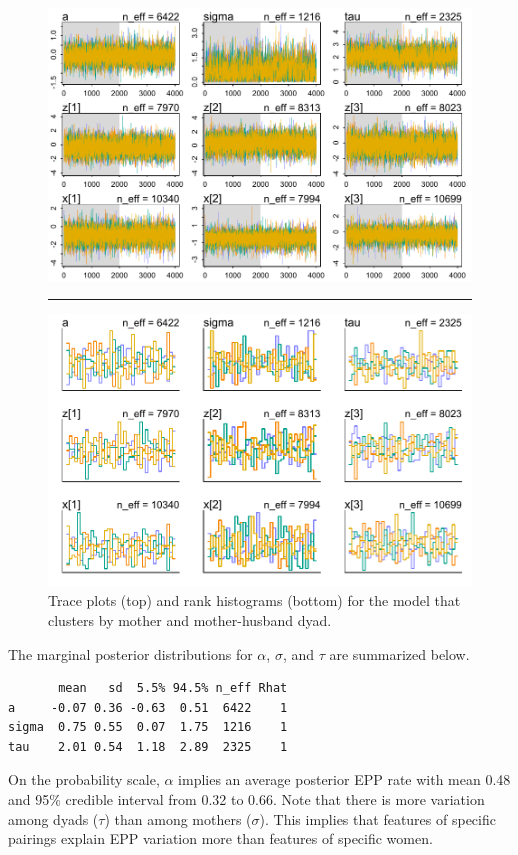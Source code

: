 \documentclass[reqno ,12pt]{amsart}
\begin{document}
\begin{figure}[p]
\begin{center}
	\includegraphics[scale=0.7]{trace.pdf}
	\hrule
	\includegraphics[scale=0.7]{trank.pdf}
\caption{Trace plots (top) and rank histograms (bottom) for the model that clusters by mother and mother-husband dyad.}
\label{fig_traces}
\end{center}
\end{figure}

The marginal posterior distributions for $\alpha$, $\sigma$, and $\tau$ are summarized below.
\begin{verbatim}
       mean   sd  5.5% 94.5% n_eff Rhat
a     -0.07 0.36 -0.63  0.51  6422    1
sigma  0.75 0.55  0.07  1.75  1216    1
tau    2.01 0.54  1.18  2.89  2325    1
\end{verbatim}
On the probability scale, $\alpha$ implies an average posterior EPP rate with mean 0.48 and 95\% credible interval from 0.32 to 0.66. Note that there is more variation among dyads ($\tau$) than among mothers ($\sigma$). This implies that features of specific pairings explain EPP variation more than features of specific women.
\end{document}

